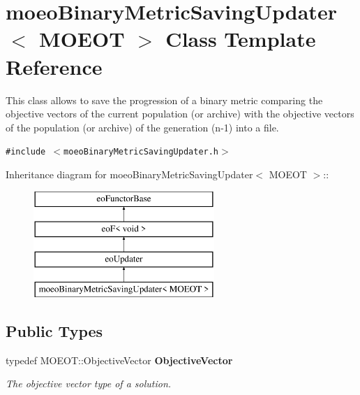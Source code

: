 \section{moeo\-Binary\-Metric\-Saving\-Updater$<$ MOEOT $>$ Class Template Reference}
\label{classmoeoBinaryMetricSavingUpdater}
This class allows to save the progression of a binary metric comparing the objective vectors of the current population (or archive) with the objective vectors of the population (or archive) of the generation (n-1) into a file.  


{\tt \#include $<$moeo\-Binary\-Metric\-Saving\-Updater.h$>$}

Inheritance diagram for moeo\-Binary\-Metric\-Saving\-Updater$<$ MOEOT $>$::\begin{figure}[H]
\begin{center}
\leavevmode
\includegraphics[height=4cm]{classmoeoBinaryMetricSavingUpdater}
\end{center}
\end{figure}
\subsection*{Public Types}
\begin{CompactItemize}
\item 
typedef MOEOT::Objective\-Vector \bf{Objective\-Vector}\label{classmoeoBinaryMetricSavingUpdater_21c2b12ee8600d8550eff42bcba87fd2}

\begin{CompactList}\small\item\em The objective vector type of a solution. \item\end{CompactList}\end{CompactItemize}

